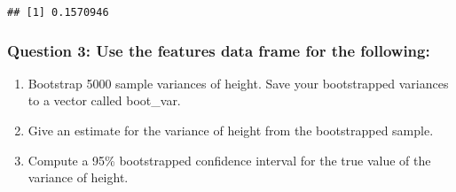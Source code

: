 \documentclass[
]{article}
\newenvironment{Shaded}{\begin{snugshade}}{\end{snugshade}}
\newcommand{\AttributeTok}[1]{\textcolor[rgb]{0.77,0.63,0.00}{#1}}
\newcommand{\CommentTok}[1]{\textcolor[rgb]{0.56,0.35,0.01}{\textit{#1}}}
\newcommand{\ConstantTok}[1]{\textcolor[rgb]{0.00,0.00,0.00}{#1}}
\newcommand{\ControlFlowTok}[1]{\textcolor[rgb]{0.13,0.29,0.53}{\textbf{#1}}}
\newcommand{\DecValTok}[1]{\textcolor[rgb]{0.00,0.00,0.81}{#1}}
\newcommand{\FunctionTok}[1]{\textcolor[rgb]{0.00,0.00,0.00}{#1}}
\newcommand{\NormalTok}[1]{#1}
\newcommand{\OtherTok}[1]{\textcolor[rgb]{0.56,0.35,0.01}{#1}}
\newcommand{\SpecialCharTok}[1]{\textcolor[rgb]{0.00,0.00,0.00}{#1}}
\begin{document}
\begin{Shaded}
\end{Shaded}

\begin{verbatim}
## [1] 0.1570946
\end{verbatim}

\hypertarget{question-3-use-the-features-data-frame-for-the-following}{%
\subsubsection{Question 3: Use the features data frame for the
following:}\label{question-3-use-the-features-data-frame-for-the-following}}

\begin{enumerate}
\def\labelenumi{(\alph{enumi})}
\item
  Bootstrap 5000 sample variances of height. Save your bootstrapped
  variances to a vector called boot\_var.
\item
  Give an estimate for the variance of height from the bootstrapped
  sample.
\item
  Compute a 95\% bootstrapped confidence interval for the true value of
  the variance of height.
\end{enumerate}

\begin{Shaded}
\end{Shaded}
\end{document}
